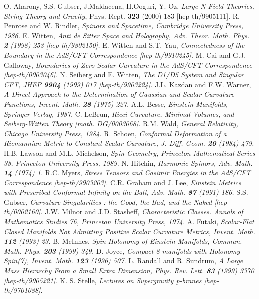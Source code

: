 \documentclass[a4paper,12pt]{article}
\theoremstyle{definition}
\renewcommand{\-}{\myHighlight{$\dfrac{\quad\enspace}{\quad}$}\coordHE{}}
\begin{document}
\begin{thebibliography}{4} 

 O. Aharony, S.S. Gubser, J.Maldacena, H.Ooguri, Y. Oz, \emph{Large N Field Theories, String Theory and Gravity}, Phys. Rept. {\bf 323} (2000) 183 [hep-th/9905111].
 R. Penrose and W. Rindler, \emph{Spinors and Spacetime, Cambridge University Press, 1986.}
 E. Witten, \emph{Anti de Sitter Space and Holography, Adv. Theor. Math. Phys. {\bf 2} (1998) 253 [hep-th/9802150].}
 E. Witten and S.T. Yau, \emph{Connectedness of the Boundary in the AdS/CFT Correspondence [hep-th/9910245].}
 M. Cai and G.J. Galloway, \emph{Boundaries of Zero Scalar Curvature in the AdS/CFT Correspondence [hep-th/0003046].}
 N. Seiberg and E. Witten, \emph{The D1/D5 System and Singular CFT, JHEP {\bf 9904} (1999) 017 [hep-th/9903224].}
 J.L. Kazdan and F.W. Warner, \emph{A Direct Approach to the Determination of Gaussian and Scalar Curvature Functions, Invent. Math. {\bf 28} (1975) 227.}
 A.L. Besse, \emph{Einstein Manifolds, Springer-Verlag, 1987.}
 C. LeBrun, \emph{Ricci Curvature, Minimal Volumes, and Seiberg-Witten Theory [math. DG/0003068].}
 R.M. Wald, \emph{General Relativity, Chicago University Press, 1984.}
 R. Schoen, \emph{Conformal Deformation of a Riemannian Metric to Constant Scalar Curvature, J. Diff. Geom. {\bf 20} (1984) 479.}
 H.B. Lawson and M.L. Michelson, \emph{Spin Geometry, Princeton Mathematical Series 38, Princeton University Press, 1989.}
 N. Hitchin, \emph{Harmonic Spinors, Adv. Math. {\bf 14} (1974) 1.}
 R.C. Myers, \emph{Stress Tensors and Casimir Energies in the AdS/CFT Correspondence [hep-th/9903203].}
 C.R. Graham and J. Lee, \emph{Einstein Metrics with Prescribed Conformal Infinity on the Ball, Adv. Math. {\bf 87} (1991) 186.}
 S.S. Gubser, \emph{Curvature Singularities : the Good, the Bad, and the Naked [hep-th/0002160].}
 J.W. Milnor and J.D. Stasheff, \emph{Characteristic Classes. Annals of Mathematics Studies 76, Princeton University Press, 1974.}
 A. Futaki, \emph{Scalar-Flat Closed Manifolds Not Admitting Positive Scalar Curvature Metrics, Invent. Math. {\bf 112} (1993) 23.}
 B. McInnes, \emph{Spin Holonomy of Einstein Manifolds, Commun. Math. Phys. {\bf 203} (1999) 349.}
 D. Joyce, \emph{Compact 8-manifolds with Holonomy Spin(7), Invent. Math. {\bf 123} (1996) 507.}
 L. Randall and R. Sundrum, \emph{A Large Mass Hierarchy From a Small Extra Dimension, Phys. Rev. Lett. {\bf 83} (1999) 3370 [hep-th/9905221].}
 K. S. Stelle, \emph{Lectures on Supergravity p-branes [hep-th/9701088].}
\end{thebibliography}
\end{document}

